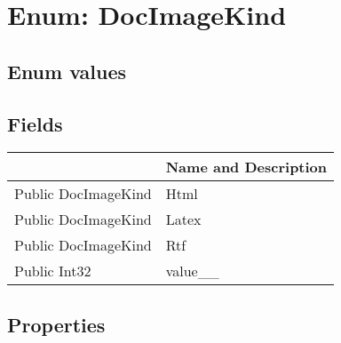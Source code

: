 \documentclass[11pt, oneside, a4paper]{book}
\begin{document}
\hypertarget{SoftwareEngineeringTools.{}Documentation.{}DocImageKind}{}
\section{Enum: DocImageKind}

\subsection{Enum values}

\subsection{Fields}
\begin{center}
\begin{tabular}{| p{3cm} | p{12cm} | }
\hline
\textbf{ } & \textbf{ Name and Description}\\
\hline
 Public  DocImageKind &  Html\hypertarget{SoftwareEngineeringTools.{}Documentation.{}DocImageKind.{}Html}{}\\
\hline
 Public  DocImageKind &  Latex\hypertarget{SoftwareEngineeringTools.{}Documentation.{}DocImageKind.{}Latex}{}\\
\hline
 Public  DocImageKind &  Rtf\hypertarget{SoftwareEngineeringTools.{}Documentation.{}DocImageKind.{}Rtf}{}\\
\hline
 Public  Int32 &  value\_\_\hypertarget{SoftwareEngineeringTools.{}Documentation.{}DocImageKind.{}value\_\_}{}\\
\hline
\end{tabular}
\end{center}

\subsection{Properties}
\end{document}
